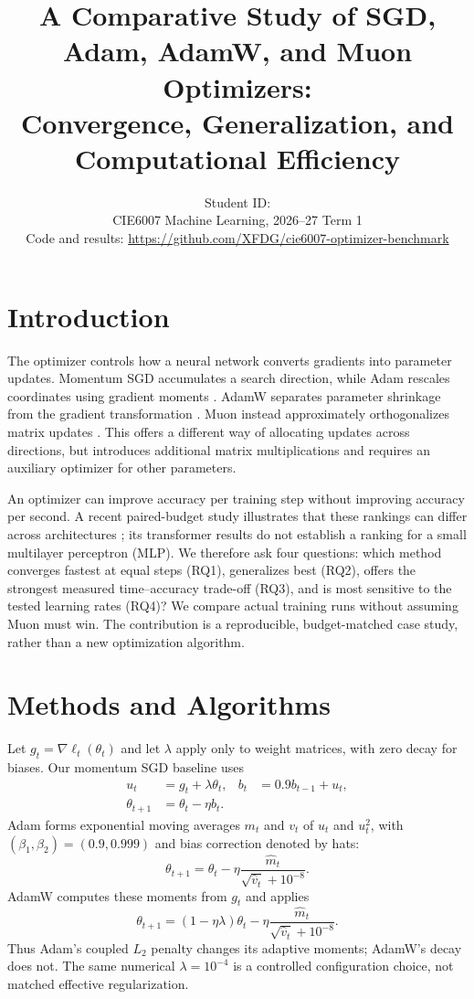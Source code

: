 \documentclass[10pt,a4paper,twocolumn]{article}
\title{\vspace{-7mm}\Large\bfseries A Comparative Study of SGD, Adam, AdamW, and Muon Optimizers:\\Convergence, Generalization, and Computational Efficiency}
\author{\normalsize\studentname\quad Student ID: \studentnumber\\\normalsize CIE6007 Machine Learning, 2026--27 Term 1\\\normalsize Code and results: \url{https://github.com/XFDG/cie6007-optimizer-benchmark}}
\date{}
\begin{document}
\maketitle


\section{Introduction}
The optimizer controls how a neural network converts gradients into parameter updates. Momentum SGD accumulates a search direction, while Adam rescales coordinates using gradient moments \cite{momentum,adam}. AdamW separates parameter shrinkage from the gradient transformation \cite{adamw}. Muon instead approximately orthogonalizes matrix updates \cite{muon}. This offers a different way of allocating updates across directions, but introduces additional matrix multiplications and requires an auxiliary optimizer for other parameters.

An optimizer can improve accuracy per training step without improving accuracy per second. A recent paired-budget study illustrates that these rankings can differ across architectures \cite{paired}; its transformer results do not establish a ranking for a small multilayer perceptron (MLP). We therefore ask four questions: which method converges fastest at equal steps (RQ1), generalizes best (RQ2), offers the strongest measured time--accuracy trade-off (RQ3), and is most sensitive to the tested learning rates (RQ4)? We compare actual training runs without assuming Muon must win. The contribution is a reproducible, budget-matched case study, rather than a new optimization algorithm.

\section{Methods and Algorithms}
Let $g_t=\nabla\ell_t(\theta_t)$ and let $\lambda$ apply only to weight matrices, with zero decay for biases. Our momentum SGD baseline uses
\begin{align}
 u_t&=g_t+\lambda\theta_t, & b_t&=0.9b_{t-1}+u_t,\nonumber\\
 \theta_{t+1}&=\theta_t-\eta b_t.\label{eq:sgd}
\end{align}
Adam forms exponential moving averages $m_t$ and $v_t$ of $u_t$ and $u_t^2$, with $(\beta_1,\beta_2)=(0.9,0.999)$ and bias correction denoted by hats:
\begin{equation}
 \theta_{t+1}=\theta_t-\eta\frac{\hat m_t}{\sqrt{\hat v_t}+10^{-8}}.
\end{equation}
AdamW computes these moments from $g_t$ and applies
\begin{equation}
 \theta_{t+1}=(1-\eta\lambda)\theta_t
 -\eta\frac{\hat m_t}{\sqrt{\hat v_t}+10^{-8}}.
\end{equation}
Thus Adam's coupled $L_2$ penalty changes its adaptive moments; AdamW's decay does not. The same numerical $\lambda=10^{-4}$ is a controlled configuration choice, not matched effective regularization.
\end{document}
